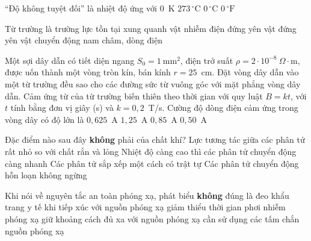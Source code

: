 	\begin{ex}%
		``Độ không tuyệt đối'' là nhiệt độ ứng với
		\choice
		{\True $0$~K}
		{$273\,^\circ\text{C}$}
		{$0\,^\circ\text{C}$}
		{$0\,^\circ\text{F}$}
	\end{ex}

	\begin{ex}%
		Từ trường là trường lực tồn tại xung quanh
		\choice
		{vật nhiễm điện đứng yên}
		{vật đứng yên}
		{vật chuyển động}
		{\True nam châm, dòng điện}
	\end{ex}

	\begin{ex}%
		Một sợi dây dẫn có tiết diện ngang $S_0=1~\text{mm}^2$, điện trở suất $\rho=2\cdot 10^{-8}~\Omega\cdot\text{m}$, được uốn thành một vòng tròn kín, bán kính $r=25$~cm. Đặt vòng dây dẫn vào một từ trường đều sao cho các đường sức từ vuông góc với mặt phẳng vòng dây dẫn. Cảm ứng từ của từ trường biến thiên theo thời gian với quy luật $B=kt$, với $t$ tính bằng đơn vị giây (s) và $k=0{,}2$~T/s. Cường độ dòng điện cảm ứng trong vòng dây có độ lớn là
		\choice
		{$0{,}625$~A}
		{\True $1{,}25$~A}
		{$0{,}85$~A}
		{$0{,}50$~A}
	\end{ex}

	\begin{ex}%
		Đặc điểm nào sau đây \textbf{không} phải của chất khí?
		\choice
		{Lực tương tác giữa các phân tử rất nhỏ so với chất rắn và lỏng}
		{Nhiệt độ càng cao thì các phân tử chuyển động càng nhanh}
		{\True Các phân tử sắp xếp một cách có trật tự}
		{Các phân tử chuyển động hỗn loạn không ngừng}
	\end{ex}

	\begin{ex}%
		Khi nói về nguyên tắc an toàn phóng xạ, phát biểu \textbf{không} đúng là
		\choice
		{\True đeo khẩu trang y tế khi tiếp xúc với nguồn phóng xạ}
		{giảm thiểu thời gian phơi nhiễm phóng xạ}
		{giữ khoảng cách đủ xa với nguồn phóng xạ}
		{cần sử dụng các tấm chắn nguồn phóng xạ}
	\end{ex}

